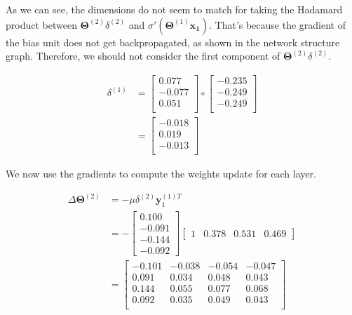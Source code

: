 \documentclass[a4paper, 10pt, twoside]{article}
\begin{document}
\begin{enumerate}[a)]
	      As we can see, the dimensions do not seem to match for taking the Hadamard product between $\bm{\Theta}^{(2)} \delta^{(2)}$ and $\sigma' \left(\bm{\Theta}^{(1)} \bm{x_1} \right)$. That's because the gradient of the bias unit does not get backpropagated, as shown in the network structure graph. Therefore, we should not consider the first component of $\bm{\Theta}^{(2)} \delta^{(2)}$.

	      \begin{align*}
		      \delta^{(1)}
		       & =
		      \begin{bmatrix}
			      0.077  \\
			      -0.077 \\
			      0.051  \\
		      \end{bmatrix}
		      \circ
		      \begin{bmatrix}
			      -0.235 \\
			      -0.249 \\
			      -0.249 \\
		      \end{bmatrix} \\
		       & =
		      \begin{bmatrix}
			      -0.018 \\
			      0.019  \\
			      -0.013 \\
		      \end{bmatrix}
	      \end{align*}

	      We now use the gradients to compute the weights update for each layer.

	      \begin{align*}
		      \Delta\bm{\Theta}^{(2)}
		       & = - \mu \delta^{(2)} \bm{y}_1^{(1)T} \\
		       & = -
		      \begin{bmatrix}
			      0.100 \\ -0.091 \\ -0.144 \\ -0.092
		      \end{bmatrix}
		      \begin{bmatrix}
			      1 & 0.378 & 0.531 & 0.469
		      \end{bmatrix}              \\
		       & =
		      \begin{bmatrix}
			      -0.101 & -0.038 & -0.054 & -0.047 \\
			      0.091  & 0.034  & 0.048  & 0.043  \\
			      0.144  & 0.055  & 0.077  & 0.068  \\
			      0.092  & 0.035  & 0.049  & 0.043  \\
		      \end{bmatrix}
	      \end{align*}


\end{enumerate}
\end{document}
